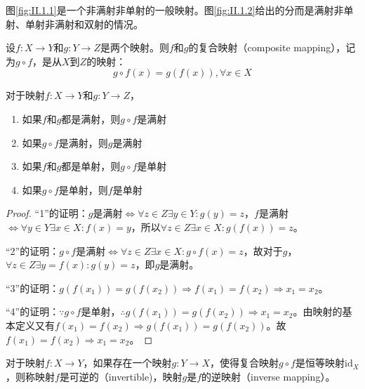 \documentclass[../main.tex]{subfiles}
\begin{document}
图\ref{fig:II.1.1}是一个非满射非单射的一般映射。图\ref{fig:II.1.2}给出的分而是满射非单射、单射非满射和双射的情况。

\begin{definition}[复合映射]
    设$f:X\rightarrow Y$和$g:Y\rightarrow Z$是两个映射。则$f$和$g$的复合映射（composite mapping），记为$g\circ f$，是从$X$到$Z$的映射：
    \[g\circ f\left(x\right)=g\left(f\left(x\right)\right),\forall x\in X\]
\end{definition}

\begin{theorem}
    对于映射$f:X\rightarrow Y$和$g: Y\rightarrow Z$，
    \begin{enumerate}
        \item 如果$f$和$g$都是满射，则$g\circ f$是满射
        \item 如果$g\circ f$是满射，则$g$是满射
        \item 如果$f$和$g$都是单射，则$g\circ f$是单射
        \item 如果$g\circ f$是单射，则$f$是单射
    \end{enumerate}
\end{theorem}
\begin{proof}
    “1”的证明：$g$是满射$\Leftrightarrow\forall z\in Z\exists y\in Y:g\left(y\right)=z$，$f$是满射$\Leftrightarrow\forall y\in Y\exists x\in X:f\left(x\right)=y$，所以$\forall z\in Z\exists x\in X:g\left(f\left(x\right)\right)=z$。

    “2”的证明：$g\circ f$是满射$\Leftrightarrow\forall z\in Z\exists x\in X:g\circ f\left(x\right)=z$，故对于$g$，$\forall z\in Z\exists y=f\left(x\right):g\left(y\right)=z$，即$g$是满射。

    “3”的证明：$g\left(f\left(x_1\right)\right)=g\left(f\left(x_2\right)\right)\Rightarrow f\left(x_1\right)=f\left(x_2\right)\Rightarrow x_1=x_2$。

    “4”的证明：$\because g\circ f$是单射，$\therefore g\left(f\left(x_1\right)\right)=g\left(f\left(x_2\right)\right)\Rightarrow x_1=x_2$。由映射的基本定义又有$f\left(x_1\right)=f\left(x_2\right)\Rightarrow g\left(f\left(x_1\right)\right)=g\left(f\left(x_2\right)\right)$。故$f\left(x_1\right)=f\left(x_2\right)\Rightarrow x_1=x_2$。
\end{proof}


\begin{definition}[逆映射]\label{def:II.1.14}
    对于映射$f:X\rightarrow Y$，如果存在一个映射$g:Y\rightarrow X$，使得复合映射$g\circ f$是恒等映射$\mathrm{id}_X$，则称映射$f$是可逆的（invertible)，映射$g$是$f$的逆映射（inverse mapping）。
\end{definition}
\end{document}
